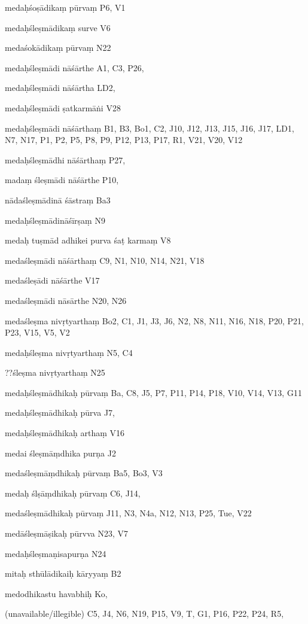 \begin{ekdosis}
\begin{marma}[hp01_055]
\begin{marma}[hp02_009]
\begin{marma}[hp02_011]
 \begin{marma}[hp02_021]
\item[medaḥśoṣādikaṃ pūrvaṃ] P6, V1
\item[medaḥśleṣmādikaṃ surve] V6
\item[medaśokādikaṃ pūrvaṃ] N22
\item[medaḥśleṣmādi nāśārthe] A1, C3, P26, 
\item[medaḥśleṣmādi nāśārtha] LD2,
\item[medaḥśleṣmādi ṣatkarmāṅi] V28
\item[medaḥśleṣmādi nāśārthaṃ] B1, B3, Bo1, C2, J10, J12, J13, J15, J16, J17, LD1, N7, N17, P1, P2, P5, P8, P9, P12, P13, P17, R1, V21, V20, V12
\item[medaḥśleṣmādhi nāśārthaṃ] P27, 
\item[madaṃ śleṣmādi nāśārthe] P10, 
\item[nādaśleṣmādinā śāstraṃ] Ba3
\item[medaḥśleṣmādināśīrṣaṃ] N9
\item[medaḥ tuṣmād adhikei purva śaṭ karmaṃ] V8
\item[medaśleṣmādi nāśārthaṃ] C9, N1, N10, N14, N21, V18
\item[medaśleṣādi nāśārthe] V17
\item[medaśleṣmādi nāsārthe] N20, N26
\item[medaśleṣma nivṛtyarthaṃ] Bo2, C1, J1, J3, J6, N2, N8, N11, N16, N18, P20, P21, P23, V15, V5, V2
\item[medaḥśleṣma nivṛtyarthaṃ] N5, C4
\item[??śleṣma nivṛtyarthaṃ] N25
\item[medaḥśleṣmādhikaḥ pūrvaṃ] Ba, C8, J5, P7, P11, P14, P18, V10, V14, V13, G11
\item[medaḥśleṣmādhikaḥ pūrva] J7,
\item[medaḥśleṣmādhikaḥ arthaṃ] V16
\item[medai śleṣmāṃdhika purṇa] J2
\item[medaśleṣmāṃdhikaḥ pūrvaṃ] Ba5, Bo3, V3
\item[medaḥ ślṣāṃdhikaḥ pūrvaṃ] C6, J14, 
\item[medaśleṣmādhikaḥ pūrvaṃ]  J11, N3, N4a, N12, N13, P25, Tue, V22
\item[medāśleṣmāṣikaḥ pūrvva] N23, V7
\item[medaḥśleṣmaṇisapurṇa] N24 
\item[mitaḥ sthūlādikaiḥ kāryyaṃ] B2
\item[medodhikastu havabhiḥ] Ko,
\item[(unavailable/illegible)] C5, J4, N6, N19, P15, V9, T, G1, P16, P22, P24, R5,
  \begin{description}


\end{description}
\end{marma}
\end{marma}
\end{marma}
\end{marma}
\end{ekdosis}
